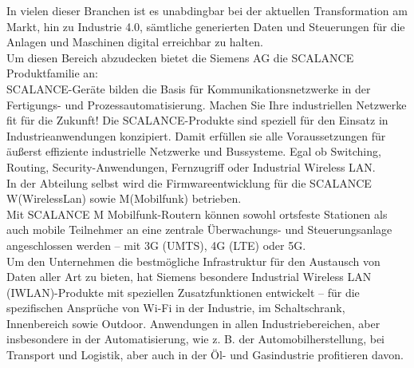 In vielen dieser Branchen ist es unabdingbar bei der aktuellen Transformation am Markt, hin zu Industrie 4.0, sämtliche generierten Daten und Steuerungen für die Anlagen und Maschinen digital erreichbar zu halten. \\
Um diesen Bereich abzudecken bietet die Siemens AG die SCALANCE Produktfamilie an: \\
SCALANCE-Geräte bilden die Basis für Kommunikationsnetzwerke in der Fertigungs- und Prozessautomatisierung. Machen Sie Ihre industriellen Netzwerke fit für die Zukunft! Die SCALANCE-Produkte sind speziell für den Einsatz in Industrieanwendungen konzipiert. Damit erfüllen sie alle Voraussetzungen für äußerst effiziente industrielle Netzwerke und Bussysteme. Egal ob Switching, Routing, Security-Anwendungen, Fernzugriff oder Industrial Wireless LAN. \cite*{SCALANCE} \\
In der Abteilung selbst wird die Firmwareentwicklung für die SCALANCE W(WirelessLan) sowie M(Mobilfunk) betrieben. \\
Mit SCALANCE M Mobilfunk-Routern können sowohl ortsfeste Stationen als auch mobile Teilnehmer an eine zentrale Überwachungs- und Steuerungsanlage angeschlossen werden – mit 3G (UMTS), 4G (LTE) oder 5G. \cite*{SCALANCEM}\\
Um den Unternehmen die bestmögliche Infrastruktur für den Austausch von Daten aller Art zu bieten, hat Siemens besondere Industrial Wireless LAN (IWLAN)-Produkte mit speziellen Zusatzfunktionen entwickelt – für die spezifischen Ansprüche von Wi-Fi in der Industrie, im Schaltschrank, Innenbereich sowie Outdoor. Anwendungen in allen Industriebereichen, aber insbesondere in der Automatisierung, wie z. B. der Automobilherstellung, bei Transport und Logistik, aber auch in der Öl- und Gasindustrie profitieren davon. \cite*{SCALANCEW}\\


